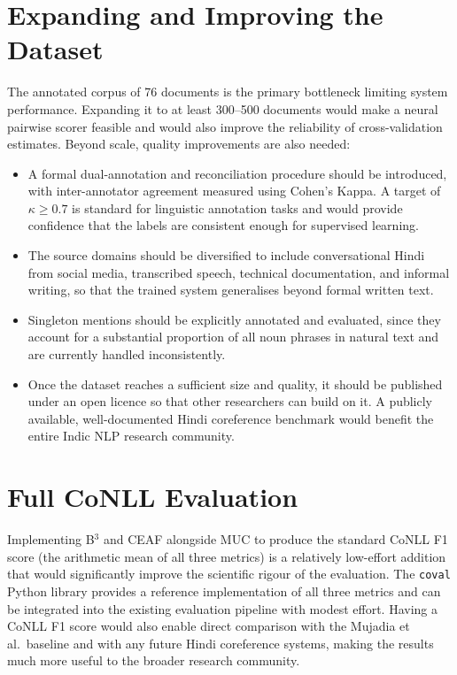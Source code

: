 \documentclass[12pt,a4paper]{report}
\begin{document}
\section{Expanding and Improving the Dataset}

The annotated corpus of 76 documents is the primary bottleneck limiting system performance. Expanding it to at least 300--500 documents would make a neural pairwise scorer feasible and would also improve the reliability of cross-validation estimates. Beyond scale, quality improvements are also needed:

\begin{itemize}
    \item A formal dual-annotation and reconciliation procedure should be introduced, with inter-annotator agreement measured using Cohen's Kappa. A target of $\kappa \geq 0.7$ is standard for linguistic annotation tasks and would provide confidence that the labels are consistent enough for supervised learning.
    \item The source domains should be diversified to include conversational Hindi from social media, transcribed speech, technical documentation, and informal writing, so that the trained system generalises beyond formal written text.
    \item Singleton mentions should be explicitly annotated and evaluated, since they account for a substantial proportion of all noun phrases in natural text and are currently handled inconsistently.
    \item Once the dataset reaches a sufficient size and quality, it should be published under an open licence so that other researchers can build on it. A publicly available, well-documented Hindi coreference benchmark would benefit the entire Indic NLP research community.
\end{itemize}

\section{Full CoNLL Evaluation}

Implementing B$^3$ and CEAF alongside MUC to produce the standard CoNLL F1 score (the arithmetic mean of all three metrics) is a relatively low-effort addition that would significantly improve the scientific rigour of the evaluation. The \texttt{coval} Python library provides a reference implementation of all three metrics and can be integrated into the existing evaluation pipeline with modest effort. Having a CoNLL F1 score would also enable direct comparison with the Mujadia et al.\ baseline \cite{mujadia2016hindi} and with any future Hindi coreference systems, making the results much more useful to the broader research community.
\end{document}
